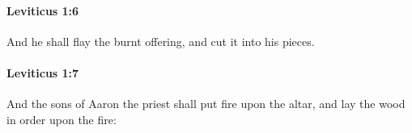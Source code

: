 		\paragraph{Leviticus 1:6} %
			\label{LEVITICUS-1-6}

			And he shall flay the burnt offering, and cut it into his pieces.


		\paragraph{Leviticus 1:7} %
			\label{LEVITICUS-1-7}

			And the sons of Aaron the priest shall put fire upon the altar, and lay the wood in order upon the fire:


